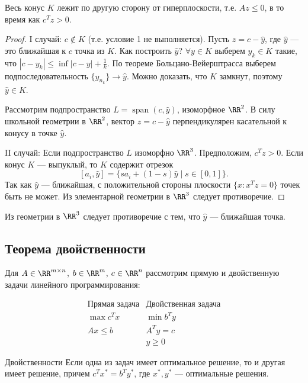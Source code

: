 \begin{Theorem}{}{}
Весь конус $K$ лежит по другую сторону от гиперплоскости, т.е. $Az \le 0$, в то время как $c^T z > 0$.
\end{Theorem}

\begin{proof}
I случай: $c \notin K$ (т.е. условие 1 не выполняется).
Пусть $z = c - \hat{y}$, где $\hat{y}$ — это ближайшая к $c$ точка из $K$. 
Как построить $\hat{y}$? 
$\forall y \in K$ выберем $y_k \in K$ такие, что $|c - y_k| \le \inf |c - y| + \frac{1}{k}$. 
По теореме Больцано-Вейерштрасса выберем подпоследовательность $\{y_{n_k}\} \to \hat{y}$. Можно доказать, что $K$ замкнут, поэтому $\hat{y} \in K$.

Рассмотрим подпространство $L = \operatorname{span}(c, \hat{y})$, изоморфное $\RR^2$. В силу школьной геометрии в $\RR^2$, вектор $z = c - \hat{y}$ перпендикулярен касательной к конусу в точке $\hat{y}$. 

II случай: Если подпространство $L$ изоморфно $\RR^3$.
Предположим, $c^T z > 0$. Если конус $K$ — выпуклый, то $K$ содержит отрезок
\[
[a_i, \hat{y}] = \{ s a_i + (1-s)\hat{y} \mid s \in [0, 1] \}.
\]
Так как $\hat{y}$ — ближайшая, с положительной стороны плоскости $\{x : x^T z = 0\}$ точек быть не может. Из элементарной геометрии в $\RR^3$ следует противоречие.
\end{proof}

\exercise
Из геометрии в $\RR^3$ следует противоречие с тем, что $\hat{y}$ — ближайшая точка.

\subsection{Теорема двойственности}

Для $A \in \RR^{m \times n}$, $b \in \RR^m$, $c \in \RR^n$ рассмотрим прямую и двойственную задачи линейного программирования:

\begin{equation*}
    \begin{array}{c|c}
        \text{Прямая задача} & \text{Двойственная задача} \\ \hline
        \max c^T x & \min b^T y \\
        Ax \le b & A^T y = c \\
        & y \ge 0
    \end{array}
\end{equation*}

\begin{Theorem}{Двойственности}{}
Если одна из задач имеет оптимальное решение, то и другая имеет решение, причем $c^T x^* = b^T y^*$, где $x^*, y^*$ — оптимальные решения.
\end{Theorem}

